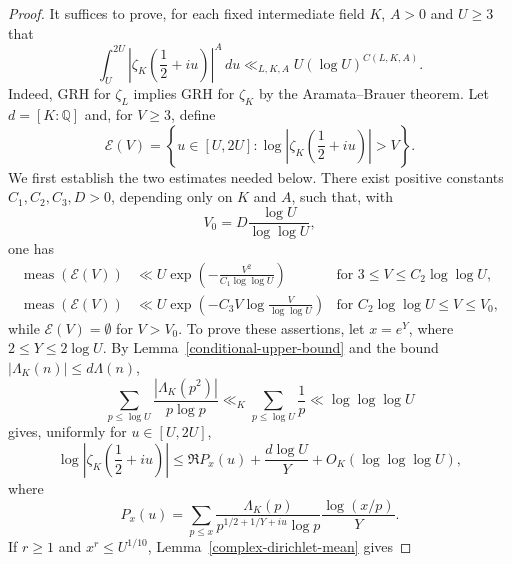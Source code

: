 \documentclass[twoside,reqno,11pt,a4paper]{amsart}
\numberwithin{equation}{section}
\theoremstyle{plain}
\theoremstyle{definition}
\theoremstyle{remark}
\renewcommand{\le}{\leqslant}
\renewcommand{\ge}{\geqslant}
\begin{document}
	\begin{proof}
It suffices to prove, for each fixed intermediate field $K$,  $A>0$ and $U\ge 3$ that
\begin{equation}\label{eq:one-field-crude-moment}
\int_U^{2U}\left|\zeta_K\left(\frac12+iu\right)\right|^A\,du
        \ll_{L,K,A} U(\log U)^{C(L,K,A)}.
\end{equation}
Indeed, GRH for $\zeta_L$ implies GRH for $\zeta_K$ by the Aramata--Brauer theorem.  Let $d=[K:\mathbb Q]$ and, for $V\ge3$, define
\begin{equation*}
        \mathcal E(V)=
        \left\{u\in[U,2U]:
        \log\left|\zeta_K\left(\frac12+iu\right)\right|>V\right\}.
\end{equation*}
We first establish the two estimates needed below.  There exist positive constants $C_1,C_2,C_3,D>0$, depending only on $K$ and $A$, such that, with
\begin{equation*}
        V_0=D\frac{\log U}{\log\log U},
\end{equation*}
one has
\begin{align}
\label{eq:dedekind-large-values-small}
        \operatorname{meas}(\mathcal E(V))
        &\ll
        U\exp\left(-\frac{V^2}{C_1\log\log U}\right)
         &\text{for }3\le  V\le  C_2\log\log U,\\
\label{eq:dedekind-large-values-large}
        \operatorname{meas}(\mathcal E(V))
        &\ll
        U\exp\left(-C_3V\log\frac{V}{\log\log U}\right)
        &\text{for }C_2\log\log U\le V\le V_0,
\end{align}
while $\mathcal E(V)=\emptyset$ for $V>V_0$.  To prove these assertions, let $x=e^Y$, where $2\le Y\le2\log U$.  By Lemma~\ref{conditional-upper-bound} and the bound $|\Lambda_K(n)|\le d\Lambda(n)$,
\begin{equation*}
        \sum_{p\le  \log U}\frac{|\Lambda_K(p^2)|}{p\log p}
        \ll_K \sum_{p\le\log U}\frac1p
        \ll\log\log\log U
\end{equation*}
gives, uniformly for $u\in[U,2U]$,
\begin{equation}\label{eq:sound-prime-majorant}
        \log\left|\zeta_K\left(\frac12+iu\right)\right|
        \le
        \Re P_x(u)+\frac{d\log U}{Y}+O_K(\log\log\log U),
\end{equation}
where
\begin{equation*}
        P_x(u)=
        \sum_{p\le  x}
        \frac{\Lambda_K(p)}{p^{1/2+1/Y+iu}\log p}
        \frac{\log(x/p)}{Y}.
\end{equation*}
If $r\ge1$ and $x^r\le U^{1/10}$, Lemma~\ref{complex-dirichlet-mean} gives

\end{proof}
\end{document}
